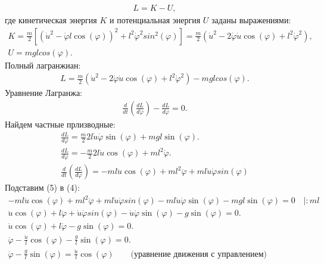 \documentclass[12pt]{article}
\begin{document}
\begin{gather}
L=K-U,
\end{gather}
где кинетическая энергия $K$ и потенциальная энергия $U$ заданы выражениями:
\begin{gather}
K = \frac{m}{2}[(\dot{u}^2-\dot{\varphi}l\cos(\varphi))^2+l^2\dot{\varphi}^2sin^2(\varphi)] = \frac{m}{2}(\dot{u}^2-2\dot{\varphi}\dot{u}\cos(\varphi)+l^2\dot{\varphi}^2),\nonumber\\
U=mglcos(\varphi).
\end{gather}
Полный лагранжиан:
\begin{gather}
L=\frac{m}{2}(\dot{u}^2-2\dot{\varphi}\dot{u}\cos(\varphi)+l^2\dot{\varphi}^2)-mglcos(\varphi).
\end{gather}
Уравнение Лагранжа:
\begin{gather}
\frac{d}{dt}\left(\frac{dL}{d\dot{\varphi}}\right)-\frac{dL}{d\varphi}=0.
\end{gather}
Найдем частные прлизводные:
\begin{gather}
\frac{dL}{d\varphi}= \frac{m}{2}2l\dot{u}\dot{\varphi}\sin(\varphi)+mgl\sin(\varphi).\nonumber\\
\frac{dL}{d\dot{\varphi}}=-\frac{m}{2}2l\dot{u}\cos(\varphi)+ml^2\dot{\varphi}.\nonumber\\
\frac{d}{dt}\left(\frac{dL}{d\dot{\varphi}}\right)=-ml\ddot{u}\cos(\varphi)+ml^2\ddot{\varphi}+ml\dot{u}\dot{\varphi}sin(\varphi)
\end{gather}
Подставим (5) в (4):
\begin{gather}
-ml\ddot{u}\cos(\varphi)+ml^2\ddot{\varphi}+ml\dot{u}\dot{\varphi}sin(\varphi)-ml\dot{u}\dot{\varphi}\sin(\varphi)-mgl\sin(\varphi)=0    \quad| :ml\nonumber\\
\ddot{u}\cos(\varphi)+l\ddot{\varphi}+\dot{u}\dot{\varphi}sin(\varphi)-\dot{u}\dot{\varphi}\sin(\varphi)-g\sin(\varphi)=0.\nonumber\\
\ddot{u}\cos(\varphi)+l\ddot{\varphi}-g\sin(\varphi)=0.\nonumber\\
\ddot{\varphi}-\frac{\ddot{u}}{l}\cos(\varphi)-\frac{g}{l}\sin(\varphi)=0.\nonumber\\
\boxed{\ddot{\varphi} - \frac{g}{l} \sin(\varphi) = \frac{\ddot{u}}{l} \cos(\varphi)} \qquad \text{(уравнение движения с управлением)}
\end{gather}



\newpage
\end{document}
